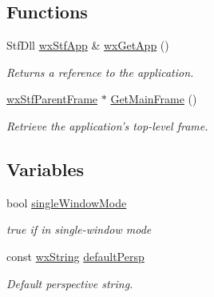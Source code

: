 \subsection*{Functions}
\begin{DoxyCompactItemize}
\item 
\hypertarget{group__wxstf_ga10919857dea79326b815ec8555077e07}{
StfDll \hyperlink{classwxStfApp}{wxStfApp} \& \hyperlink{group__wxstf_ga10919857dea79326b815ec8555077e07}{wxGetApp} ()}
\label{group__wxstf_ga10919857dea79326b815ec8555077e07}

\begin{DoxyCompactList}\small\item\em Returns a reference to the application. \item\end{DoxyCompactList}\item 
\hyperlink{classwxStfParentFrame}{wxStfParentFrame} $\ast$ \hyperlink{group__wxstf_gac1dfaac894e39fdac1507247318a00ac}{GetMainFrame} ()
\begin{DoxyCompactList}\small\item\em Retrieve the application's top-\/level frame. \item\end{DoxyCompactList}\end{DoxyCompactItemize}
\subsection*{Variables}
\begin{DoxyCompactItemize}
\item 
\hypertarget{group__wxstf_ga3b3cd43da4976041b4a034eeefdea07e}{
bool \hyperlink{group__wxstf_ga3b3cd43da4976041b4a034eeefdea07e}{singleWindowMode}}
\label{group__wxstf_ga3b3cd43da4976041b4a034eeefdea07e}

\begin{DoxyCompactList}\small\item\em true if in single-\/window mode \item\end{DoxyCompactList}\item 
const \hyperlink{classwxString}{wxString} \hyperlink{group__wxstf_ga4683d89bd1f06c731e1eecda0e88f371}{defaultPersp}
\begin{DoxyCompactList}\small\item\em Default perspective string. \item\end{DoxyCompactList}\end{DoxyCompactItemize}


